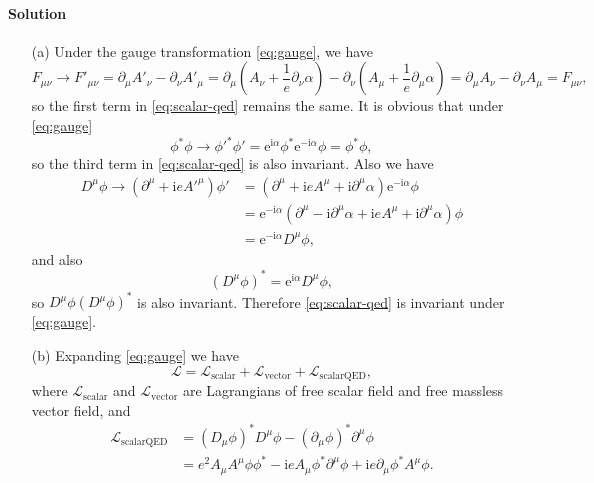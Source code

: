 \documentclass[hyperref, a4paper]{article}
\newcommand*{\ii}{\mathrm{i}}
\newcommand*{\ee}{\mathrm{e}}
\begin{document}
\paragraph{Solution} \begin{itemize}
\item[(a)] Under the gauge transformation \eqref{eq:gauge}, we have 
\[
    F_{\mu \nu}  \to 
    F'_{\mu \nu} = \partial_\mu A'_\nu - \partial_\nu A'_\mu
    = \partial_\mu \left(A_\nu + \frac{1}{e} \partial_\nu \alpha\right) 
    - \partial_\nu \left(A_\mu + \frac{1}{e} \partial_\mu \alpha\right)
    = \partial_\mu A_\nu - \partial_\nu A_\mu = F_{\mu \nu},
\] 
so the first term in \eqref{eq:scalar-qed} remains the same. It is obvious that under \eqref{eq:gauge}
\[
    \phi^* \phi \to \phi'^* \phi' = \ee^{\ii \alpha} \phi^* \ee^{- \ii \alpha} \phi = \phi^* \phi,
\]
so the third term in \eqref{eq:scalar-qed} is also invariant. Also we have
\[
    \begin{aligned}
        D^\mu \phi \to (\partial^\mu + \ii e A'^\mu) \phi' 
        &= (\partial^\mu + \ii e A^\mu + \ii \partial^\mu \alpha) \ee^{- \ii \alpha} \phi  \\
        &= \ee^{- \ii \alpha} (\partial^\mu - \ii \partial^\mu \alpha 
        + \ii e A^\mu + \ii \partial^\mu \alpha) \phi \\
        &= \ee^{- \ii \alpha} D^\mu \phi,
    \end{aligned}
\]
and also 
\[
    (D^\mu \phi)^* = \ee^{\ii \alpha} D^\mu \phi, 
\]
so $D^\mu \phi (D^\mu \phi)^*$ is also invariant. 
Therefore \eqref{eq:scalar-qed} is invariant under \eqref{eq:gauge}.

\item[(b)] Expanding \eqref{eq:gauge} we have 
\begin{equation}
    \mathcal{L} = \mathcal{L}_\text{scalar} + \mathcal{L}_\text{vector} + \mathcal{L}_\text{scalarQED},
\end{equation} 
where $\mathcal{L}_\text{scalar}$ and $\mathcal{L}_\text{vector}$ are Lagrangians of free scalar field and 
free massless vector field, and 
\begin{equation}
    \begin{aligned}
        \mathcal{L}_\text{scalarQED} &= (D_{\mu} \phi)^{*} D^{\mu} \phi - (\partial_\mu \phi)^* \partial^\mu \phi \\
        &= e^2 A_\mu A^\mu \phi \phi^* - \ii e A_\mu \phi^* \partial^\mu \phi + \ii e \partial_\mu \phi^* A^\mu \phi .
    \end{aligned}
\end{equation}


\end{itemize}
\end{document}
